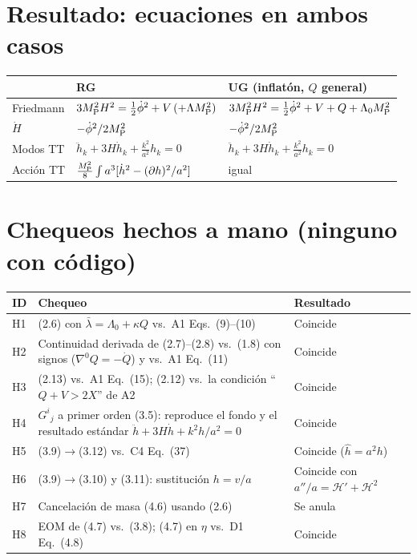 \documentclass[11pt,a4paper]{article}
\newcommand{\MP}{M_{\rm P}}
\begin{document}
\section{Resultado: ecuaciones en ambos casos}

\begin{center}\small
\renewcommand{\arraystretch}{1.4}
\begin{tabular}{@{}L{2.3cm}L{6.2cm}L{6.4cm}@{}}
\toprule
& \textbf{RG} & \textbf{UG (inflatón, $Q$ general)}\\
\midrule
Friedmann & $3\MP^2H^2=\tfrac12\dot\phi^2+V\,(+\Lambda\MP^2)$ & $3\MP^2H^2=\tfrac12\dot\phi^2+V+Q+\Lambda_0\MP^2$\\
$\dot H$ & $-\dot\phi^2/2\MP^2$ & $-\dot\phi^2/2\MP^2$\\
Modos TT & $\ddot h_k+3H\dot h_k+\frac{k^2}{a^2}h_k=0$ & $\ddot h_k+3H\dot h_k+\frac{k^2}{a^2}h_k=0$\\
Acción TT & $\frac{\MP^2}8\int a^3[\dot h^2-(\partial h)^2/a^2]$ & igual\\
\bottomrule
\end{tabular}
\end{center}

\section{Chequeos hechos a mano (ninguno con código)}\label{sec:chk}

\begin{center}\small
\renewcommand{\arraystretch}{1.25}
\begin{tabular}{@{}L{0.9cm}L{11.2cm}L{2.8cm}@{}}
\toprule
\textbf{ID} & \textbf{Chequeo} & \textbf{Resultado}\\
\midrule
H1 & (2.6) con $\bar\lambda=\Lambda_0+\kappa Q$ vs.\ A1 Eqs.~(9)--(10) & Coincide\\
H2 & Continuidad derivada de (2.7)--(2.8) vs.\ (1.8) con signos ($\nabla^0Q=-\dot Q$) y vs.\ A1 Eq.~(11) & Coincide\\
H3 & (2.13) vs.\ A1 Eq.~(15); (2.12) vs.\ la condición ``$Q+V>2X$'' de A2 & Coincide\\
H4 & $G^i{}_j$ a primer orden (3.5): reproduce el fondo y el resultado estándar $\ddot h+3H\dot h+k^2h/a^2=0$ & Coincide\\
H5 & (3.9)$\to$(3.12) vs.\ C4 Eq.~(37) & Coincide ($\hat h=a^2h$)\\
H6 & (3.9)$\to$(3.10) y (3.11): sustitución $h=v/a$ & Coincide con $a''/a=\mathcal H'+\mathcal H^2$\\
H7 & Cancelación de masa (4.6) usando (2.6) & Se anula\\
H8 & EOM de (4.7) vs.\ (3.8); (4.7) en $\eta$ vs.\ D1 Eq.~(4.8) & Coincide\\
\bottomrule
\end{tabular}
\end{center}
\end{document}
